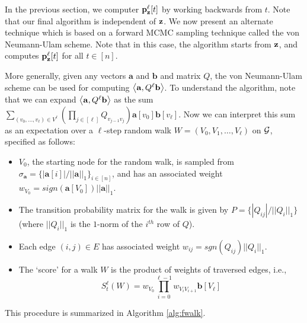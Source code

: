 In the previous section, we computer ${\mathbf{p}}_\mathbf{z}^{\ell}[t]$ by working backwards from $t$. 
Note that our final algorithm is independent of $\mathbf{z}$.
We now present an alternate technique which is based on a forward MCMC sampling technique called the von Neumann-Ulam scheme. 
Note that in this case, the algorithm starts from $\mathbf{z}$, and computes ${\mathbf{p}}_\mathbf{z}^{\ell}[t]$ for all $t\in[n]$.

More generally, given any vectors $\mathbf{a}$ and $\mathbf{b}$ and matrix $Q$, the von Neumann-Ulam scheme can be used for computing $\left< \mathbf{a}, Q^{\ell}\mathbf{b} \right>$.
To understand the algorithm, note that we can expand $\left< \mathbf{a}, Q^{\ell}\mathbf{b} \right>$ as the sum $\sum_{(v_0,\ldots, v_{\ell}) \in V^{\ell}}\left(\prod_{j \in [{\ell}]} Q_{v_{j-1}v_{j}} \right) \mathbf{a}[v_0] \mathbf{b}[v_{\ell}]$. 
Now we can interpret this sum as an expectation over a ${\ell}$-step random walk $W = (V_0,V_1,\ldots,V_{\ell})$ on ${\mathcal{G}}$, specified as follows:
\begin{itemize}
\item $V_0$, the starting node for the random walk, is sampled from $\sigma_{\mathbf{a}} = \{|\mathbf{a}[i]|/||\mathbf{a}||_1\}_{i\in [n]}$, and has an associated weight $w_{V_0} = sign(\mathbf{a}[V_0])||\mathbf{a}||_1$.
\item The transition probability matrix for the walk is given by $P = \{|Q_{ij}|/||Q_i||_1\}$ (where $||Q_i||_1$ is the $1$-norm of the $i^{th}$ row of $Q$).
\item Each edge $(i,j)\in E$ has associated weight $w_{ij} = sgn(Q_{ij})||Q_i||_1$. 
\item The `score' for a walk $W$ is the product of weights of traversed edges, i.e.,
$$S_t^{\ell}(W) = w_{V_0}\prod_{i=0}^{{\ell}-1}w_{V_iV_{i+1}}\mathbf{b}[V_{\ell}]$$
\end{itemize}
This procedure is summarized in Algorithm \ref{alg:fwalk}. 

